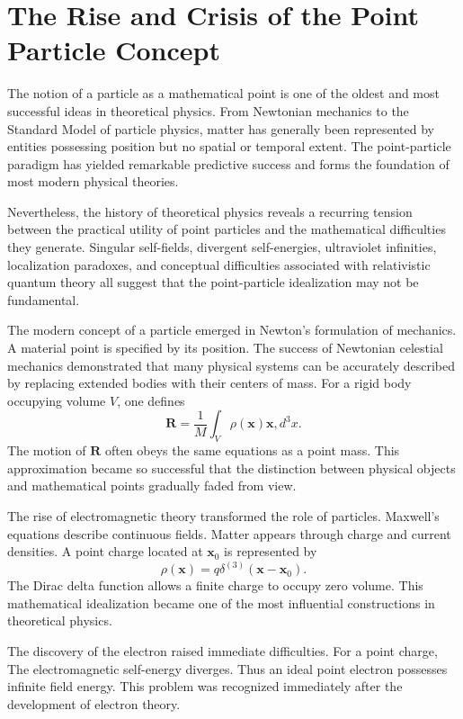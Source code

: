 \section{The Rise and Crisis of the Point Particle Concept}
The notion of a particle as a mathematical point is one of the oldest and
most successful ideas in theoretical physics. From Newtonian mechanics to 
the Standard Model of particle physics, matter has generally been 
represented by entities possessing position but no spatial or temporal
extent. The point-particle paradigm has yielded remarkable predictive
success and forms the foundation of most modern physical theories.

Nevertheless, the history of theoretical physics reveals a recurring 
tension between the practical utility of point particles and the 
mathematical difficulties they generate. Singular self-fields, divergent
self-energies, ultraviolet infinities, localization paradoxes, and conceptual
difficulties associated with relativistic quantum theory all suggest that
the point-particle idealization may not be fundamental.

The modern concept of a particle emerged in Newton's formulation of mechanics.
A material point is specified by its position.
The success of Newtonian celestial mechanics demonstrated that many physical
systems can be accurately described by replacing extended bodies with 
their centers of mass.
For a rigid body occupying volume $V$, one defines
\[
\mathbf{R}=\frac{1}{M}
\int_V \rho(\mathbf{x})\mathbf{x},d^3x.
\]
The motion of $\mathbf{R}$ often obeys the same equations as a point mass.
This approximation became so successful that the distinction between 
physical objects and mathematical points gradually faded from view.

The rise of electromagnetic theory transformed the role of particles.
Maxwell's equations describe continuous fields.
Matter appears through charge and current densities.
A point charge located at $\mathbf{x}_0$ is represented by
\[
\rho(\mathbf{x})=q\delta^{(3)}(\mathbf{x}-\mathbf{x}_0).
\]
The Dirac delta function allows a finite charge to occupy zero volume.
This mathematical idealization became one of the most influential 
constructions in theoretical physics.

The discovery of the electron raised immediate difficulties.
For a point charge,
The electromagnetic self-energy diverges.
Thus an ideal point electron possesses infinite field energy.
This problem was recognized immediately after the development of
electron theory.

